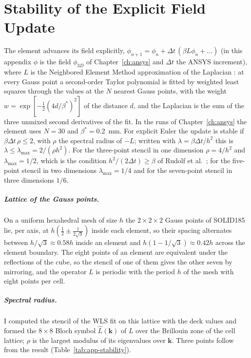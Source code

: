 \chapter{Stability of the Explicit Field Update}
\label{app:stability}


The element advances its field explicitly,
$\phi_{n+1}=\phi_n+\Delta t\,(\beta L\phi_n+\ldots)$ (in this appendix $\phi$ is the field $\phi_{3D}$ of
Chapter~\ref{ch:ansys} and $\Delta t$ the ANSYS increment), where $L$ is the
Neighbored Element Method approximation of the Laplacian
\cite{Blaszczyk2022TaylorWLS,Rudolf2025NEM}: at every Gauss point a
second-order Taylor polynomial is fitted by weighted least squares through
the values at the $N$ nearest Gauss points, with the weight
$w=\exp[-\tfrac12(4d/\beta^*)^2]$ of the distance $d$, and the Laplacian is
the sum of the three unmixed second derivatives of the fit. In the runs of
Chapter~\ref{ch:ansys} the element uses $N=30$ and $\beta^*=0.2$~mm. For
explicit Euler the update is stable if $\beta\Delta t\,\rho\le2$, with $\rho$
the spectral radius of $-L$; written with $\lambda=\beta\Delta t/h^2$ this is
$\lambda\le\lambda_{\max}=2/(\rho h^2)$. For the three-point stencil in one
dimension $\rho=4/h^2$ and $\lambda_{\max}=1/2$, which is the condition
$h^2/(2\Delta t)\ge\beta$ of Rudolf et al.~\cite{Rudolf2025NEM}; for the
five-point stencil in two dimensions $\lambda_{\max}=1/4$ and for the
seven-point stencil in three dimensions $1/6$.

\paragraph{Lattice of the Gauss points.} On a uniform hexahedral mesh
of size $h$ the $2\times2\times2$ Gauss points of SOLID185 lie, per
axis, at $h(\tfrac12\pm\tfrac{1}{2\sqrt3})$ inside each element, so their
spacing alternates between $h/\sqrt3\approx0.58h$ inside an element and
$h(1-1/\sqrt3)\approx0.42h$ across the element boundary. The eight points of
an element are equivalent under the reflections of the cube, so the stencil
of one of them gives the other seven by mirroring, and the operator $L$ is
periodic with the period $h$ of the mesh with eight points per cell.

\paragraph{Spectral radius.} I computed the stencil of the WLS fit on this
lattice with the deck values and formed the $8\times8$ Bloch symbol
$\hat L(\mathbf k)$ of $L$ over the Brillouin zone of the cell lattice; $\rho$
is the largest modulus of its eigenvalues over $\mathbf k$. Three points
follow from the result (Table~\ref{tab:app-stability}).

